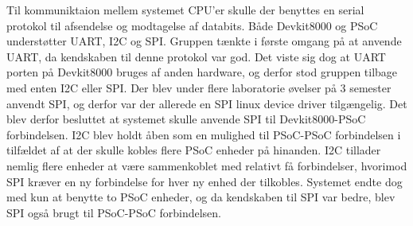 Til kommuniktaion mellem systemet CPU'er skulle der benyttes en serial protokol til afsendelse og modtagelse af databits.
Både Devkit8000 og PSoC understøtter UART, I2C og SPI. Gruppen tænkte i første omgang på at anvende UART, da kendskaben til denne protokol var god.
Det viste sig dog at UART porten på Devkit8000 bruges af anden hardware, og derfor stod gruppen tilbage med enten I2C eller SPI. Der blev under flere 
laboratorie øvelser på 3 semester anvendt SPI, og derfor var der allerede en SPI linux device driver tilgængelig. Det blev derfor besluttet at systemet 
skulle anvende SPI til Devkit8000-PSoC forbindelsen. I2C blev holdt åben som en mulighed til PSoC-PSoC forbindelsen i tilfældet af at der skulle kobles 
flere PSoC enheder på hinanden. I2C tillader nemlig flere enheder at være sammenkoblet med relativt få forbindelser, hvorimod SPI kræver en ny forbindelse for 
hver ny enhed der tilkobles. Systemet endte dog med kun at benytte to PSoC enheder, og da kendskaben til SPI var bedre, blev SPI også brugt til PSoC-PSoC
forbindelsen.     
